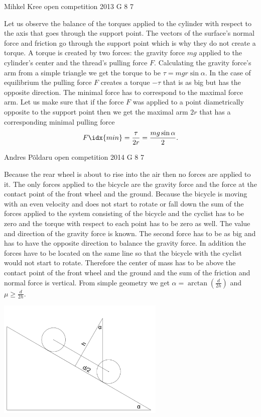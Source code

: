 \documentclass[11pt]{article}
\begin{document}
{Mihkel Kree} %
{open competition} %
{2013} %
{G 8} %
{7} %
{

\ifEngSolution
Let us observe the balance of the torques applied to the cylinder with respect to the axis that goes through the support point. The vectors of the surface’s normal force and friction go through the support point which is why they do not create a torque. A torque is created by two forces: the gravity force $mg$ applied to the cylinder’s center and the thread’s pulling force $F$. Calculating the gravity force’s arm from a simple triangle we get the torque to be $\tau=mgr\sin\alpha$. In the case of equilibrium the pulling force $F$ creates a torque $-\tau$ that is as big but has the opposite direction. The minimal force has to correspond to the maximal force arm. Let us make sure that if the force $F$ was applied to a point diametrically opposite to the support point then we get the maximal arm $2r$ that has a corresponding minimal pulling force
\[F\idx{min}=\frac{\tau}{2r}=\frac{mg\sin\alpha}{2}.\]
\fi
}

{Andres Põldaru} %
{open competition} %
{2014} %
{G 8} %
{7} %
{

\ifEngSolution
Because the rear wheel is about to rise into the air then no forces are applied to it. The only forces applied to the bicycle are the gravity force and the force at the contact point of the front wheel and the ground. Because the bicycle is moving with an even velocity and does not start to rotate or fall down the sum of the forces applied to the system consisting of the bicycle and the cyclist has to be zero and the torque with respect to each point has to be zero as well. The value and direction of the gravity force is known. The second force has to be as big and has to have the opposite direction to balance the gravity force. In addition the forces have to be located on the same line so that the bicycle with the cyclist would not start to rotate. Therefore the center of mass has to be above the contact point of the front wheel and the ground and the sum of the friction and normal force is vertical. From simple geometry we get $\alpha=\arctan(\frac{d}{2h})$ and $\mu\ge\frac{d}{2h}$. 
\begin{center}
\includegraphics[width=0.6\textwidth]{2014-lahg-08-ratas}
\end{center}
\fi
}
\end{document}

